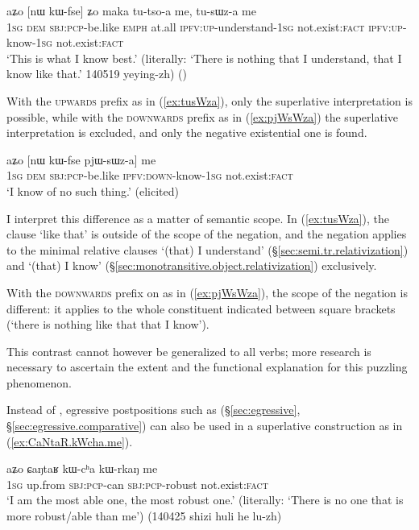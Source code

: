 \begin{exe}
\ex \label{ex:tusWza}
\gll aʑo [nɯ kɯ-fse] ʑo maka tu-tso-a me, tu-sɯz-a me \\
\textsc{1sg} \textsc{dem} \textsc{sbj}:\textsc{pcp}-be.like \textsc{emph} at.all \textsc{ipfv}:\textsc{up}-understand-\textsc{1sg} not.exist:\textsc{fact} \textsc{ipfv}:\textsc{up}-know-\textsc{1sg} not.exist:\textsc{fact} \\
\glt `This is what I know best.' (literally: `There is nothing that I understand, that I know like that.' 140519 yeying-zh)
()
\end{exe}

With the \textsc{upwards} prefix  as in (\ref{ex:tusWza}), only the superlative interpretation is possible, while with the \textsc{downwards} prefix  as in (\ref{ex:pjWsWza}) the superlative interpretation is excluded, and only the negative existential one is found.

\begin{exe}
\ex \label{ex:pjWsWza}
\gll aʑo [nɯ kɯ-fse pjɯ-sɯz-a] me \\
\textsc{1sg} \textsc{dem} \textsc{sbj}:\textsc{pcp}-be.like \textsc{ipfv}:\textsc{down}-know-\textsc{1sg} not.exist:\textsc{fact} \\
\glt `I know of no such thing.' (elicited)
\end{exe}

I interpret this difference as a matter of semantic scope. In (\ref{ex:tusWza}),  the clause  `like that' is outside of the scope of the negation, and the negation applies to the minimal relative clauses  `(that) I understand' (§\ref{sec:semi.tr.relativization}) and  `(that) I know' (§\ref{sec:monotransitive.object.relativization}) exclusively. 

With the \textsc{downwards} prefix  on  as in (\ref{ex:pjWsWza}), the scope of the negation is different: it applies to the whole constituent indicated between square brackets (`there is nothing like that that I know').

This contrast cannot however be generalized to all verbs; more research is necessary to ascertain the extent and the functional explanation for this puzzling phenomenon.

Instead of , egressive postpositions such as  (§\ref{sec:egressive},  §\ref{sec:egressive.comparative}) can also be used in a superlative construction as in (\ref{ex:CaNtaR.kWcha.me}).

\begin{exe}
\ex \label{ex:CaNtaR.kWcha.me}
\gll  aʑo ɕaŋtaʁ kɯ-cʰa kɯ-rkaŋ me \\
\textsc{1sg} up.from \textsc{sbj}:\textsc{pcp}-can  \textsc{sbj}:\textsc{pcp}-robust not.exist:\textsc{fact} \\
\glt `I am the most able one, the most robust one.' (literally: `There is no one that is more robust/able than me') (140425 shizi huli he lu-zh)
\end{exe}